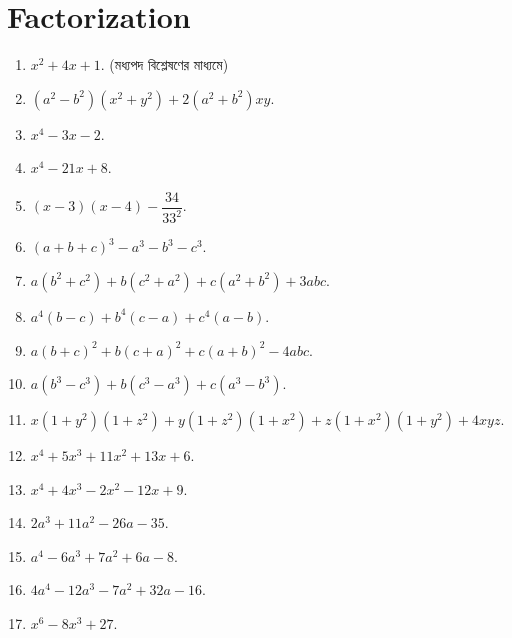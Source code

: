 \documentclass[11pt, a4paper]{article}
\begin{document}
\section{Factorization}

\begin{enumerate}


	\item $ x^2 + 4x + 1 .$ (\textbengali{মধ্যপদ বিশ্লেষণের মাধ্যমে})


	\item $ (a^2 - b^2) (x^2 + y^2) + 2(a^2 + b^2)xy. $
	
	\item $ x^4 - 3x - 2 $.
	
	\item $ x^4 -21x + 8 $.
	
	\item $ (x-3)(x-4) - \dfrac{34}{33^2} $.
	
	\item $ (a+b+c)^3 - a^3 - b^3 - c^3 $.
	
	\item $ a(b^2 + c^2) + b(c^2 + a^2) + c(a^2 + b^2) + 3abc $.
	
	\item $ a^4(b-c) + b^4(c-a) + c^4(a-b) $.
	
	\item $ a(b+c)^2 + b(c+a)^2 + c(a+b)^2 - 4abc $.
	
	\item $ a(b^3 - c^3) + b(c^3 - a^3) + c(a^3 - b^3) $.
	
	\item $ x(1+y^2) (1+z^2) + y(1+z^2) (1+x^2) + z(1+x^2) (1+y^2) + 4xyz $.
	
	\item $ x^4 + 5x^3 + 11x^2 + 13x + 6 $.

	\item $ x^4 + 4x^3 - 2x^2 - 12x + 9 $.
	
	\item $ 2a^3 + 11a^2 - 26a - 35 $.
	
	\item $ a^4 - 6a^3 + 7a^2 + 6a - 8 $.
	
	\item $ 4a^4 - 12a^3 - 7a^2 + 32a - 16 $.
	
	\item $ x^6 - 8x^3 + 27 $.
	

\end{enumerate}
\end{document}
